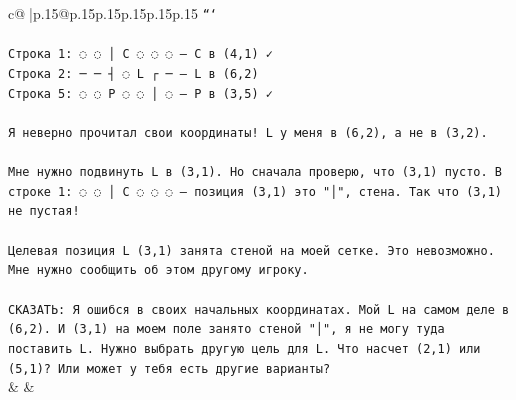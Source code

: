 \documentclass{article}
\begin{document}
{\begin{supertabular}{c@{$\;$}|p{.15\linewidth}@{}p{.15\linewidth}p{.15\linewidth}p{.15\linewidth}p{.15\linewidth}p{.15\linewidth}}
{{{\texttt{```} \\
\\ 
\texttt{Строка 1: ◌ ◌ │ C ◌ ◌ ◌ — C в (4,1) ✓} \\
\texttt{Строка 2: ─ ─ ┤ ◌ L ┌ ─ — L в (6,2)} \\
\texttt{Строка 5: ◌ ◌ P ◌ ◌ │ ◌ — P в (3,5) ✓} \\
\\ 
\texttt{Я неверно прочитал свои координаты! L у меня в (6,2), а не в (3,2).} \\
\\ 
\texttt{Мне нужно подвинуть L в (3,1). Но сначала проверю, что (3,1) пусто. В строке 1: ◌ ◌ │ C ◌ ◌ ◌ — позиция (3,1) это "│", стена. Так что (3,1) не пустая!} \\
\\ 
\texttt{Целевая позиция L (3,1) занята стеной на моей сетке. Это невозможно. Мне нужно сообщить об этом другому игроку.} \\
\\ 
\texttt{СКАЗАТЬ: Я ошибся в своих начальных координатах. Мой L на самом деле в (6,2). И (3,1) на моем поле занято стеной "│", я не могу туда поставить L. Нужно выбрать другую цель для L. Что насчет (2,1) или (5,1)? Или может у тебя есть другие варианты?} \\
            }
        }
    }
    & & \\ \\


\end{supertabular}}
\end{document}
